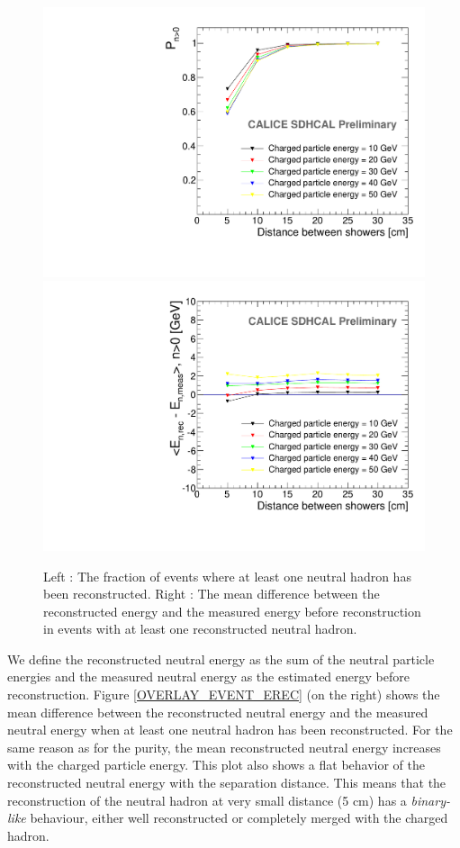 \documentclass[cits]{JINST}
\begin{document}
\begin{figure}[!h]
  \begin{center}
    \includegraphics[width=0.47\linewidth]{plots/OverlayEvent_NeutralPercentage.pdf}
    \includegraphics[width=0.47\linewidth]{plots/OverlayEvent_NeutralEnergyDifferenceMeanNeutralEfficient.pdf}
  \end{center}
  \caption{\label{OVERLAY_EVENT_EREC} \label{OVERLAY_EVENT_NEUTRAL_PERCENTAGE} Left : The fraction of events where at least one neutral hadron has been reconstructed. Right : The mean difference between the reconstructed energy and the measured energy before reconstruction in events with at least one reconstructed neutral hadron.}
\end{figure}

We define the reconstructed neutral energy as the sum of the neutral particle energies and the measured neutral energy as the estimated energy before reconstruction. Figure \ref{OVERLAY_EVENT_EREC} (on the right) shows the mean difference between the reconstructed neutral energy and the measured neutral energy when at least one neutral hadron has been reconstructed. For the same reason as for the purity, the mean reconstructed neutral energy increases with the charged particle energy. This plot also shows a flat behavior of the reconstructed neutral energy with the separation distance. This means that the reconstruction of the neutral hadron at very small distance (5 cm) has a \textit{binary-like} behaviour, either well reconstructed or completely merged with the charged hadron.

\newpage
\end{document}
